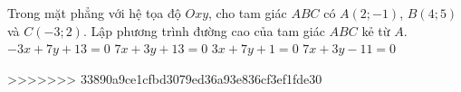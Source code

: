 \begin{ex}%
	Trong mặt phẳng với hệ tọa độ $Oxy$, cho tam giác $ABC$ có
	$A(2;-1)$, $B(4;5)$ và $C(-3;2)$. Lập phương trình đường cao của tam giác $ABC$ kẻ từ $A$.
	\choice
	{$-3x +7y +13 =0$}
	{$7x +3y +13=0$}
	{$3x +7y+1 =0$}
	{\True $7x +3y -11 =0$}
\end{ex}



>>>>>>> 33890a9ce1cfbd3079ed36a93e836cf3ef1fde30
